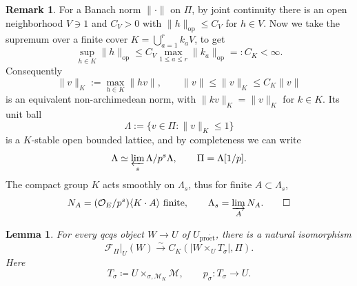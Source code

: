 \documentclass[11pt]{article}
\newtheorem{lemma}[theorem]{Lemma}
\theoremstyle{definition}
\newtheorem{remark}[theorem]{Remark}
\newcommand{\cO}{\mathcal O}
\newcommand{\cM}{\mathcal M}
\newcommand{\cF}{\mathcal F}
\newcommand{\proet}{\mathrm{pro\acute et}}
\begin{document}
\begin{remark}%
\label{rem:Banach-no-admissibility}
For a Banach norm \(\|\cdot\|\) on \(\Pi\), by joint continuity
there is an open neighborhood \(V\ni1\) and \(C_V>0\) with
\(\|h\|_{\mathrm{op}}\leq C_V\) for \(h\in V\).
Now we take the supremum over a finite cover \(K=\bigcup_{a=1}^r k_aV\), to get
\begin{equation*}
 \sup_{h\in K}\|h\|_{\mathrm{op}}
 \leq C_V\max_{1\leq a\leq r}\|k_a\|_{\mathrm{op}}
 =:C_K<\infty.
\end{equation*}
Consequently
\begin{equation*}
 \|v\|_K:=\max_{h\in K}\|hv\|,
 \qquad \|v\|\leq\|v\|_K\leq C_K\|v\|
\end{equation*}
is an equivalent non-archimedean norm, with
\(\|kv\|_K=\|v\|_K\) for \(k\in K\).  Its unit ball
\begin{equation*}
 \Lambda:=\{v\in\Pi:\|v\|_K\leq1\}
\end{equation*}
is a \(K\)-stable open bounded lattice, and by completeness we can write
\begin{equation*}
 \Lambda\simeq\varprojlim_s\Lambda/p^s\Lambda,\qquad
 \Pi=\Lambda[1/p].
\end{equation*}
The compact group $K$ acts smoothly on $\Lambda_s$, thus
for finite \(A\subset\Lambda_s\),
\begin{equation*}
 N_A=(\cO_E/p^s)\langle K\cdot A\rangle\text{ finite},
 \qquad \Lambda_s=\varinjlim_A N_A.
\qedhere
\end{equation*}
\end{remark}

\begin{lemma}
\label{lem:RH-local-torsor-formula}
For every qcqs object \(W\to U\) of \(U_{\proet}\), there is a
natural isomorphism
\begin{equation*}
 \cF_\Pi|_U(W)
 \xrightarrow{\sim}
 C_K
 \left(
  \left|W\times_UT_\sigma\right|,
  \Pi
 \right).
\end{equation*}
Here
\begin{equation*}
 T_\sigma
 \coloneqq U\times_{\sigma,\cM_K}\cM,
 \qquad
 p_\sigma:T_\sigma\longrightarrow U.
\end{equation*}
\end{lemma}
\end{document}
